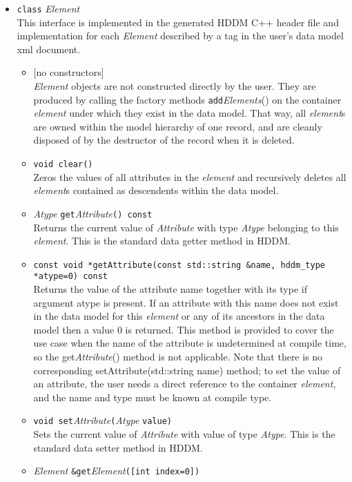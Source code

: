 \documentclass{revtex4}
\begin{document}
\begin{itemize}
\begin{itemize}
\end{itemize}
\item \texttt{class} {\em Element}\\
This interface is implemented in the generated HDDM C++ header file and
implementation for each {\em Element} described by a tag in the user's
data model xml document.
\begin{itemize}
\item {}[no constructors]\\
{\em Element} objects are not constructed directly by the user. They are
produced by calling the factory methods \texttt{add}{\em Elements}() on
the container {\em element} under which they exist in the data model.
That way, all {\em element}s are owned within the model hierarchy of one
record, and are cleanly disposed of by the destructor of the record when it
is deleted.
\item \texttt{void clear()}\\
Zeros the values of all attributes in the {\em element} and recursively
deletes all {\em element}s contained as descendents within the data model.
\item {\em Atype} \texttt{get}{\em Attribute}\texttt{() const}\\
Returns the current value of {\em Attribute} with type {\em Atype}
belonging to this {\em element}. This is the standard data getter method
in HDDM.
\item \texttt{const void *getAttribute(const std::string \&name, hddm\_type *atype=0) const}\\
Returns the value of the attribute name together with its type if argument
atype is present. If an attribute with this name does not exist in the data
model for this {\em element} or any of its ancestors in the data model then a 
value 0 is returned. This method is provided to cover the use case when the
name of the attribute is undetermined at compile time, so the 
get{\em Attribute}() method is not applicable. Note that there is no corresponding
setAttribute(std::string name) method; to set the value of an attribute, the
user needs a direct reference to the container {\em element}, and the name
and type must be known at compile type.
\item \texttt{void set}{\em Attribute}\texttt{(}{\em Atype} \texttt{value)}\\
Sets the current value of {\em Attribute} with value of type {\em Atype}.
This is the standard data setter method in HDDM.
\item {\em Element} \texttt{\&get}{\em Element}\texttt{([int index=0])}\\

\end{itemize}
\end{itemize}
\end{document}
